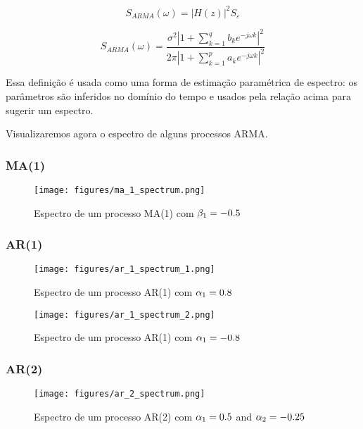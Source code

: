 $$ S_{ARMA}(\omega) = |H(z)|^2 S_{\varepsilon} $$

\begin{equation}\label{eq:arma_spectrum}
     S_{ARMA}(\omega) = \frac{\sigma^2 |1 + \sum_{k=1}^{q} b_k e^{-j\omega k}|^2}{2\pi|1 + \sum_{k=1}^{p} a_k e^{-j\omega k}|^2}
\end{equation}

Essa definição é usada como uma forma de estimação paramétrica de espectro:
os parâmetros são inferidos no domínio do tempo e usados pela relação acima
para sugerir um espectro.

Visualizaremos agora o espectro de alguns processos ARMA.

\subsubsection{MA(1)}

\begin{figure}[H]
    \centering
    \texttt{[image: figures/ma\_1\_spectrum.png]}
    \caption{Espectro de um processo MA(1) com
    $\protect \beta_1 = -0.5$}
    \label{fig:ma_1_spectrum}
\end{figure}

\subsubsection{AR(1)}

\begin{figure}[H]
    \centering
    \texttt{[image: figures/ar\_1\_spectrum\_1.png]}
    \caption{Espectro de um processo AR(1) com
    $\protect \alpha_1 = 0.8$}
    \label{fig:ar_1_spectrum_1}
\end{figure}

\begin{figure}[H]
    \centering
    \texttt{[image: figures/ar\_1\_spectrum\_2.png]}
    \caption{Espectro de um processo AR(1) com
    $\protect \alpha_1 = -0.8$}
    \label{fig:ar_1_spectrum_2}
\end{figure}

\subsubsection{AR(2)}

\begin{figure}[H]
    \centering
    \texttt{[image: figures/ar\_2\_spectrum.png]}
    \caption{Espectro de um processo AR(2) com
    $\protect \alpha_1 = 0.5$ and $\protect \alpha_2 = -0.25$}
    \label{fig:ar_2_spectrum}
\end{figure}


